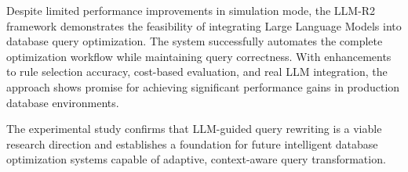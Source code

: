 \documentclass[12pt,a4paper]{article}
\begin{document}
Despite limited performance improvements in simulation mode, the LLM-R2 framework demonstrates the feasibility of integrating Large Language Models into database query optimization. The system successfully automates the complete optimization workflow while maintaining query correctness. With enhancements to rule selection accuracy, cost-based evaluation, and real LLM integration, the approach shows promise for achieving significant performance gains in production database environments.

The experimental study confirms that LLM-guided query rewriting is a viable research direction and establishes a foundation for future intelligent database optimization systems capable of adaptive, context-aware query transformation.

\newpage


\end{document}
